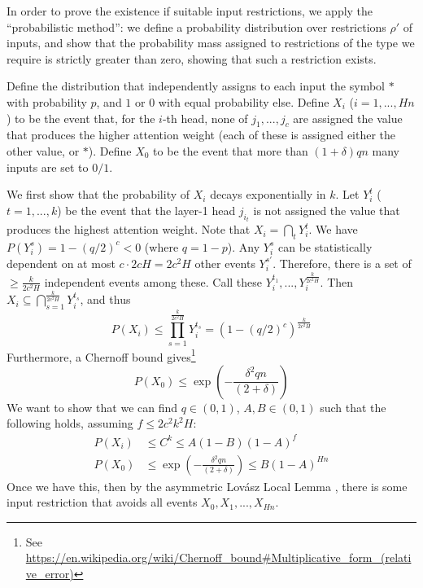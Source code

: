 \documentclass[11pt,a4paper]{article}
\begin{document}
In order to prove the existence if suitable input restrictions, we apply the ``probabilistic method'': we define a probability distribution over restrictions $\rho'$ of inputs, and show that the probability mass assigned to restrictions of the type we require is strictly greater than zero, showing that such a restriction exists.

Define the distribution that independently assigns to each input the symbol $*$ with probability $p$, and $1$ or $0$ with equal probability else.
Define $X_i$ ($i=1, ..., H n$) to be the event that, for the $i$-th head, none of $j_1, ..., j_c$ are assigned the value that produces the higher attention weight (each of these is assigned either the other value, or $*$).
Define $X_0$ to be the event that more than $(1+\delta)qn$ many inputs are set to $0/1$.

We first show that the probability of $X_i$ decays exponentially in $k$.
Let $Y_i^t$ ($t=1,...,k$) be the event that the layer-1 head $j_{i_t}$ is not assigned the value that produces the highest attention weight.
Note that $X_i = \bigcap_t Y_i^t$.
We have $P(Y_i^s) = 1-(q/2)^c < 0$ (where $q = 1-p$).
Any $Y_i^s$ can be statistically dependent on at most $c \cdot 2cH = 2c^2H$ other events $Y_i^{s'}$.
Therefore, there is a set of $\geq \frac{k}{2c^2H}$ independent events among these.
Call these $Y_i^{t_1}, ..., Y_i^{\frac{k}{2c^2H}}$.
Then $X_i \subseteq \bigcap_{s=1}^{\frac{k}{2c^2H}} Y_i^{t_s}$, and thus
\begin{equation}
    P(X_i) \leq \prod_{s=1}^{\frac{k}{2c^2H}} Y_i^{t_s} = (1-(q/2)^c)^{\frac{k}{2c^2H}}
\end{equation}
Furthermore, a Chernoff bound gives\footnote{See 
\url{https://en.wikipedia.org/wiki/Chernoff_bound#Multiplicative_form_(relative_error)}}
\begin{equation}
P(X_0) \leq    \exp\left(-\frac{\delta^2qn}{(2+\delta)}\right)
\end{equation}
We want to show that we can find $q \in (0,1)$, $A, B \in (0,1)$ such that the following holds, assuming $f \leq 2c^2k^2H$:
\begin{align}
 P(X_i) &\leq  C^k \leq A(1-B)(1-A)^f \\
P(X_0) &\leq \exp\left(-\frac{\delta^2qn}{(2+\delta)}\right)  \leq B (1-A)^{Hn}
\end{align}
Once we have this, then by the asymmetric Lov{\'a}sz Local Lemma \cite{mitzenmacherprobability}, there is some input restriction that avoids all events $X_0, X_1, ..., X_{Hn}$.
\end{document}
